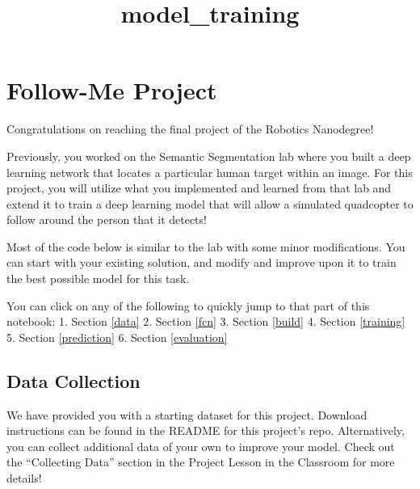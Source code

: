 \documentclass[11pt]{article}
\title{model\_training}
\begin{document}
    
    
    \maketitle
    
    

    
    \hypertarget{follow-me-project}{%
\section{Follow-Me Project}\label{follow-me-project}}

Congratulations on reaching the final project of the Robotics
Nanodegree!

Previously, you worked on the Semantic Segmentation lab where you built
a deep learning network that locates a particular human target within an
image. For this project, you will utilize what you implemented and
learned from that lab and extend it to train a deep learning model that
will allow a simulated quadcopter to follow around the person that it
detects!

Most of the code below is similar to the lab with some minor
modifications. You can start with your existing solution, and modify and
improve upon it to train the best possible model for this task.

You can click on any of the following to quickly jump to that part of
this notebook: 1. Section \ref{data} 2. Section \ref{fcn} 3.
Section \ref{build} 4. Section \ref{training} 5.
Section \ref{prediction} 6. Section \ref{evaluation}

    \hypertarget{data-collection}{%
\subsection{Data Collection}\label{data-collection}}

We have provided you with a starting dataset for this project. Download
instructions can be found in the README for this project's repo.
Alternatively, you can collect additional data of your own to improve
your model. Check out the ``Collecting Data'' section in the Project
Lesson in the Classroom for more details!
\end{document}
